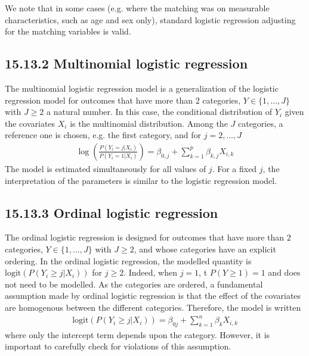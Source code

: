 \documentclass[letterpaper,10pt,english]{jupyterBook}
\begin{document}
\sphinxAtStartPar
We note that in some cases (e.g. where the matching was on measurable characteristics, such as age and sex only), standard logistic regression adjusting for the matching variables is valid.


\subsection{15.13.2  Multinomial logistic regression}
\label{\detokenize{15.l. Logistic Regression:multinomial-logistic-regression}}
\sphinxAtStartPar
The multinomial logistic regression model is a generalization of the logistic regression model for outcomes that have more than \(2\) categories, \(Y\in\{1,\dots,J\}\) with \(J\geq 2\) a natural number. In this case, the conditional distribution of \(Y_i\) given the covariates \(X_i\) is the multinomial distribution. Among the \(J\) categories, a reference one is chosen, e.g. the first category, and for \(j=2,\dots,J\)
\begin{equation*}
\begin{split}\log\left( \frac{P(Y_i=j|X_i)}{P(Y_i=1|X_i)} \right) = \beta_{0,j} + \sum_{k=1}^p \beta_{k,j}X_{i,k}\end{split}
\end{equation*}
\sphinxAtStartPar
The model is estimated simultaneously for all values of \(j\). For a fixed \(j\), the interpretation of the parameters is similar to the logistic regression model.


\subsection{15.13.3 Ordinal logistic regression}
\label{\detokenize{15.l. Logistic Regression:ordinal-logistic-regression}}
\sphinxAtStartPar
The ordinal logistic regression is designed for outcomes that have more than \(2\) categories, \(Y\in\{1,\dots,J\}\) with \(J\geq 2\), and whose categories have an explicit ordering. In the ordinal logistic regression, the modelled quantity is \(\mathrm{logit}(P(Y_i\geq j|X_i))\) for \(j\geq 2\). Indeed, when \(j=1\), t
\(P(Y\geq 1)=1\) and does not need to be modelled. As the categories are ordered, a fundamental assumption made by ordinal logistic regression is that the effect of the covariates are homogenous between the different categories. Therefore, the model is written
\begin{equation*}
\begin{split}\mathrm{logit}(P(Y_i\geq j|X_i)) = \beta_{0j} + \sum_{k=1}^n \beta_{k}X_{i,k}\end{split}
\end{equation*}
\sphinxAtStartPar
where only the intercept term depends upon the category. However, it is important to carefully check for violations of this assumption.
\end{document}
